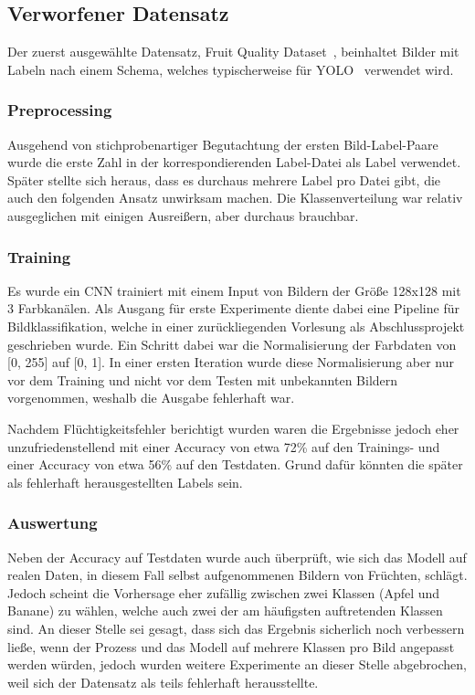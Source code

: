 \documentclass[runningheads]{llncs}
\begin{document}
\subsection{Verworfener Datensatz}
Der zuerst ausgewählte Datensatz, Fruit Quality Dataset~\cite{ref_fruit_dataset}, beinhaltet Bilder mit Labeln nach einem Schema, welches typischerweise für YOLO~\cite{ref_yolo} verwendet wird.

\subsubsection{Preprocessing} Ausgehend von stichprobenartiger Begutachtung der ersten Bild-Label-Paare wurde die erste Zahl in der korrespondierenden Label-Datei als Label verwendet. Später stellte sich heraus, dass es durchaus mehrere Label pro Datei gibt, die auch den folgenden Ansatz unwirksam machen. Die Klassenverteilung war relativ ausgeglichen mit einigen Ausreißern, aber durchaus brauchbar.

\subsubsection{Training} Es wurde ein CNN trainiert mit einem Input von Bildern der Größe 128x128 mit 3 Farbkanälen. Als Ausgang für erste Experimente diente dabei eine Pipeline für Bildklassifikation, welche in einer zurückliegenden Vorlesung als Abschlussprojekt geschrieben wurde. Ein Schritt dabei war die Normalisierung der Farbdaten von [0, 255] auf [0, 1]. In einer ersten Iteration wurde diese Normalisierung aber nur vor dem Training und nicht vor dem Testen mit unbekannten Bildern vorgenommen, weshalb die Ausgabe fehlerhaft war.

Nachdem Flüchtigkeitsfehler berichtigt wurden waren die Ergebnisse jedoch eher unzufriedenstellend mit einer Accuracy von etwa 72\% auf den Trainings- und einer Accuracy von etwa 56\% auf den Testdaten. Grund dafür könnten die später als fehlerhaft herausgestellten Labels sein.

\subsubsection{Auswertung} Neben der Accuracy auf Testdaten wurde auch überprüft, wie sich das Modell auf realen Daten, in diesem Fall selbst aufgenommenen Bildern von Früchten, schlägt. Jedoch scheint die Vorhersage eher zufällig zwischen zwei Klassen (Apfel und Banane) zu wählen, welche auch zwei der am häufigsten auftretenden Klassen sind. An dieser Stelle sei gesagt, dass sich das Ergebnis sicherlich noch verbessern ließe, wenn der Prozess und das Modell auf mehrere Klassen pro Bild angepasst werden würden, jedoch wurden weitere Experimente an dieser Stelle abgebrochen, weil sich der Datensatz als teils fehlerhaft herausstellte.
\end{document}
